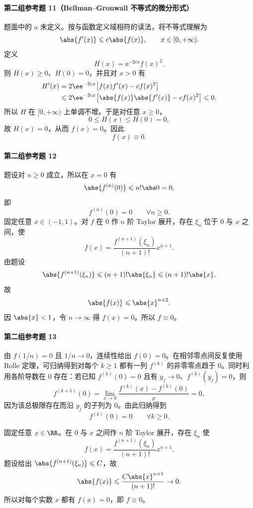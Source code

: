 \paragraph{第二组参考题 11（Bellman--Gronwall 不等式的微分形式）}
\begin{xsolution}
题面中的 $a$ 未定义。按与函数定义域相符的读法，将不等式理解为
\[
  \abs{f'(x)}\leqslant c\abs{f(x)},
  \qquad x\in[0,+\infty).
\]
定义
\[
  H(x)=\ee^{-2cx}f(x)^2.
\]
则 $H(x)\geqslant0$、$H(0)=0$，并且对 $x>0$ 有
\[
  \begin{aligned}
  H'(x)
  &=2\ee^{-2cx}\bigl[f(x)f'(x)-c f(x)^2\bigr]\\
  &\leqslant2\ee^{-2cx}
    \bigl[\abs{f(x)}\abs{f'(x)}-c f(x)^2\bigr]
  \leqslant0.
  \end{aligned}
\]
所以 $H$ 在 $[0,+\infty)$ 上单调不增。于是对任意 $x\geqslant0$，
\[
  0\leqslant H(x)\leqslant H(0)=0,
\]
故 $H(x)=0$，从而 $f(x)=0$。因此
\[
  f(x)\equiv0.
\]
\end{xsolution}

\paragraph{第二组参考题 12}
\begin{xsolution}
题设对 $n\geqslant0$ 成立，所以在 $x=0$ 有
\[
  \abs{f^{(n)}(0)}\leqslant n!\abs0=0,
\]
即
\[
  f^{(n)}(0)=0\qquad\forall n\geqslant0.
\]
固定任意 $x\in(-1,1)$。对 $f$ 在 $0$ 作 $n$ 阶 Taylor 展开，存在 $\xi_n$ 位于 $0$ 与 $x$ 之间，使
\[
  f(x)=\frac{f^{(n+1)}(\xi_n)}{(n+1)!}x^{n+1}.
\]
由题设
\[
  \abs{f^{(n+1)}(\xi_n)}\leqslant(n+1)!\abs{\xi_n}
  \leqslant(n+1)!\abs{x},
\]
故
\[
  \abs{f(x)}\leqslant\abs{x}^{n+2}.
\]
因 $\abs{x}<1$，令 $n\to\infty$ 得 $f(x)=0$。所以 $f\equiv0$。
\end{xsolution}

\paragraph{第二组参考题 13}
\begin{xsolution}
由 $f(1/n)=0$ 且 $1/n\to0$，连续性给出 $f(0)=0$。在相邻零点间反复使用 Rolle 定理，可归纳得到对每个 $k\geqslant1$ 都有一列 $f^{(k)}$ 的非零零点趋于 $0$。同时利用各阶导数在 $0$ 存在：若已知 $f^{(k)}(0)=0$ 且有 $y_j\to0$、$f^{(k)}(y_j)=0$，则
\[
  f^{(k+1)}(0)
  =\lim_{x\to0}\frac{f^{(k)}(x)-f^{(k)}(0)}x=0,
\]
因为该总极限存在而沿 $y_j$ 的子列为 $0$。由此归纳得到
\[
  f^{(k)}(0)=0\qquad\forall k\geqslant0.
\]

固定任意 $x\in\RR$。在 $0$ 与 $x$ 之间作 $n$ 阶 Taylor 展开，存在 $\xi_n$ 使
\[
  f(x)=\frac{f^{(n+1)}(\xi_n)}{(n+1)!}x^{n+1}.
\]
题设给出 $\abs{f^{(n+1)}(\xi_n)}\leqslant C$，故
\[
  \abs{f(x)}\leqslant\frac{C\abs{x}^{n+1}}{(n+1)!}\to0.
\]
所以对每个实数 $x$ 都有 $f(x)=0$，即 $f\equiv0$。
\end{xsolution}

